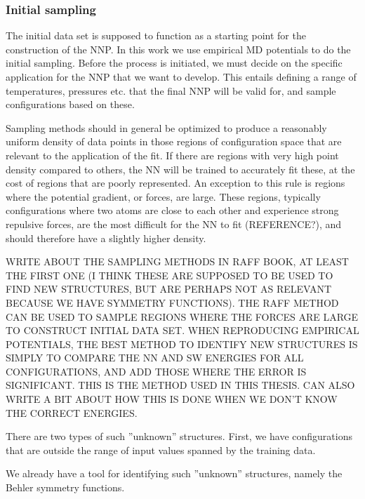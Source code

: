 \documentclass[twoside,english]{uiofysmaster}
\begin{document}
\subsubsection{Initial sampling}
The initial data set is supposed to function as a starting point for the construction of the NNP. 
In this work we use empirical MD potentials to do the initial sampling. Before the process is initiated, 
we must decide on the specific application for the NNP that we want to develop. This entails 
defining a range of temperatures, pressures etc. that the final NNP will be valid for, and sample
configurations based on these. 

Sampling methods should in general be optimized to produce a reasonably uniform density of 
data points in those regions of configuration space that are relevant to the application of the fit.
If there are regions with very high point density compared to others, the NN will be trained to accurately fit these, 
at the cost of regions that are poorly represented. An exception to this rule is regions where the potential gradient, or forces, 
are large. These regions, typically configurations where two atoms are close to each other and experience strong
repulsive forces, are the most difficult for the NN to fit (REFERENCE?), 
and should therefore have a slightly higher density. 

WRITE ABOUT THE SAMPLING METHODS IN RAFF BOOK, AT LEAST THE FIRST ONE (I THINK THESE ARE SUPPOSED TO BE USED TO FIND NEW
STRUCTURES, BUT ARE PERHAPS NOT AS RELEVANT BECAUSE WE HAVE SYMMETRY FUNCTIONS). THE RAFF METHOD CAN BE USED TO
SAMPLE REGIONS WHERE THE FORCES ARE LARGE TO CONSTRUCT INITIAL DATA SET. WHEN REPRODUCING EMPIRICAL POTENTIALS, 
THE BEST METHOD TO IDENTIFY NEW STRUCTURES IS SIMPLY TO COMPARE THE NN AND SW ENERGIES FOR ALL CONFIGURATIONS, 
AND ADD THOSE WHERE THE ERROR IS SIGNIFICANT. THIS IS THE METHOD USED IN THIS THESIS. CAN ALSO WRITE A BIT ABOUT HOW THIS
IS DONE WHEN WE DON'T KNOW THE CORRECT ENERGIES. 




There are two types of such ''unknown'' structures. 
First, we have configurations that are outside the range of input values spanned by the training data. 


We already have a tool
for identifying such ''unknown'' structures, namely the Behler symmetry functions. 


 

 
\end{document}
